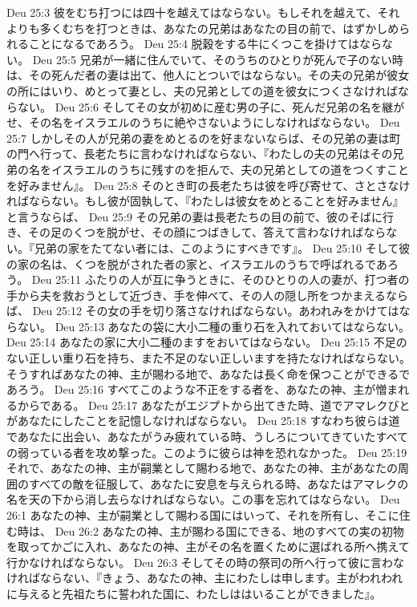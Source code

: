 Deu 25:3  彼をむち打つには四十を越えてはならない。もしそれを越えて、それよりも多くむちを打つときは、あなたの兄弟はあなたの目の前で、はずかしめられることになるであろう。
Deu 25:4  脱穀をする牛にくつこを掛けてはならない。
Deu 25:5  兄弟が一緒に住んでいて、そのうちのひとりが死んで子のない時は、その死んだ者の妻は出て、他人にとついではならない。その夫の兄弟が彼女の所にはいり、めとって妻とし、夫の兄弟としての道を彼女につくさなければならない。
Deu 25:6  そしてその女が初めに産む男の子に、死んだ兄弟の名を継がせ、その名をイスラエルのうちに絶やさないようにしなければならない。
Deu 25:7  しかしその人が兄弟の妻をめとるのを好まないならば、その兄弟の妻は町の門へ行って、長老たちに言わなければならない、『わたしの夫の兄弟はその兄弟の名をイスラエルのうちに残すのを拒んで、夫の兄弟としての道をつくすことを好みません』。
Deu 25:8  そのとき町の長老たちは彼を呼び寄せて、さとさなければならない。もし彼が固執して、『わたしは彼女をめとることを好みません』と言うならば、
Deu 25:9  その兄弟の妻は長老たちの目の前で、彼のそばに行き、その足のくつを脱がせ、その顔につばきして、答えて言わなければならない。『兄弟の家をたてない者には、このようにすべきです』。
Deu 25:10  そして彼の家の名は、くつを脱がされた者の家と、イスラエルのうちで呼ばれるであろう。
Deu 25:11  ふたりの人が互に争うときに、そのひとりの人の妻が、打つ者の手から夫を救おうとして近づき、手を伸べて、その人の隠し所をつかまえるならば、
Deu 25:12  その女の手を切り落さなければならない。あわれみをかけてはならない。
Deu 25:13  あなたの袋に大小二種の重り石を入れておいてはならない。
Deu 25:14  あなたの家に大小二種のますをおいてはならない。
Deu 25:15  不足のない正しい重り石を持ち、また不足のない正しいますを持たなければならない。そうすればあなたの神、主が賜わる地で、あなたは長く命を保つことができるであろう。
Deu 25:16  すべてこのような不正をする者を、あなたの神、主が憎まれるからである。
Deu 25:17  あなたがエジプトから出てきた時、道でアマレクびとがあなたにしたことを記憶しなければならない。
Deu 25:18  すなわち彼らは道であなたに出会い、あなたがうみ疲れている時、うしろについてきていたすべての弱っている者を攻め撃った。このように彼らは神を恐れなかった。
Deu 25:19  それで、あなたの神、主が嗣業として賜わる地で、あなたの神、主があなたの周囲のすべての敵を征服して、あなたに安息を与えられる時、あなたはアマレクの名を天の下から消し去らなければならない。この事を忘れてはならない。
Deu 26:1  あなたの神、主が嗣業として賜わる国にはいって、それを所有し、そこに住む時は、
Deu 26:2  あなたの神、主が賜わる国にできる、地のすべての実の初物を取ってかごに入れ、あなたの神、主がその名を置くために選ばれる所へ携えて行かなければならない。
Deu 26:3  そしてその時の祭司の所へ行って彼に言わなければならない、『きょう、あなたの神、主にわたしは申します。主がわれわれに与えると先祖たちに誓われた国に、わたしははいることができました』。
